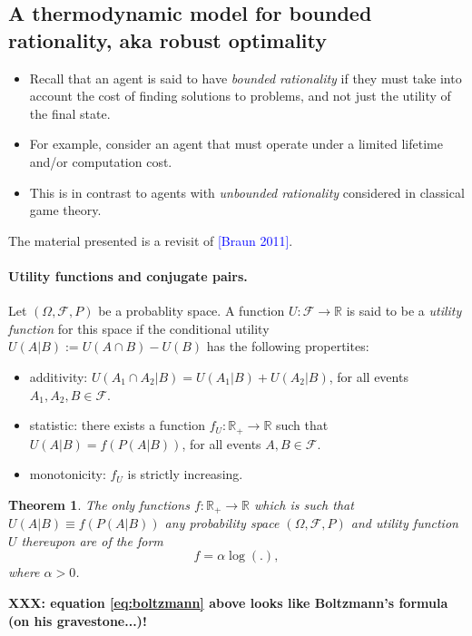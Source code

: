 \documentclass{article} %
\newtheorem{theorem}{Theorem} \newtheorem{lemma}[theorem]{Lemma}
\begin{document}
\subsection{A thermodynamic model for bounded rationality, aka robust optimality}
\begin{itemize}
  \item Recall that an agent is said to have \textit{bounded rationality} if they must take into account the cost of finding solutions to problems, and not just the utility of the final state.
  \item For example, consider an agent that must operate under a limited lifetime and/or computation cost.
  \item This is in contrast to agents with \textit{unbounded rationality} considered in classical game theory.
    \end{itemize}
The material presented is a revisit of \textcolor{blue}{[Braun 2011]}.
\paragraph{Utility functions and conjugate pairs.}
  Let $(\Omega, \mathcal F, P)$ be a probablity space. A function $U: \mathcal F \rightarrow \mathbb R$ is said to be a \textit{utility function} for this space if the conditional utility $U(A|B) := U(A \cap B) - U(B)$ has the following propertites:
  \begin{itemize}
  \item additivity: $U(A_1 \cap A_2 | B) = U(A_1|B) + U(A_2|B)$, for all events $A_1, A_2, B \in \mathcal F$.    
  \item statistic: there exists a function $f_{U} :\mathbb R_+ \rightarrow \mathbb R$ such that $U(A|B) = f(P(A|B))$, for all events
    $A,B \in \mathcal F$.
  \item monotonicity: $f_{U}$ is strictly increasing.
    \end{itemize}

\begin{theorem}
  The only functions $f: \mathbb R_+ \rightarrow \mathbb R$ which is such that $U(A|B) \equiv f(P(A|B))$ any probability space $(\Omega, \mathcal F, P)$ and utility function $U$ thereupon are of the form
  \begin{equation}
    f = \alpha \log(.),
    \label{eq:boltzmann}
  \end{equation}
  where $\alpha > 0$.
\end{theorem}

\textbf{XXX: equation \eqref{eq:boltzmann} above looks like Boltzmann's formula (on his gravestone...)!}
\end{document}
